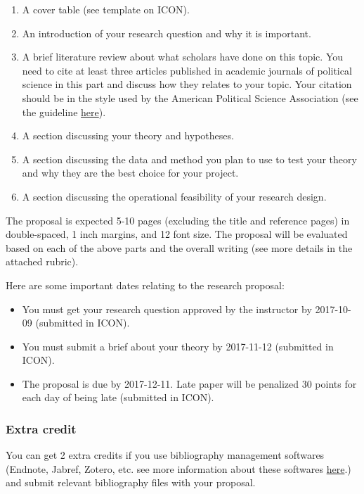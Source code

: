\documentclass[11pt,]{article}
\providecommand{\tightlist}{%
  \setlength{\itemsep}{0pt}\setlength{\parskip}{0pt}}
\theoremstyle{definition}
\theoremstyle{definition}
\theoremstyle{remark}
\begin{document}
\begin{enumerate}
\def\labelenumi{\arabic{enumi}.}
\tightlist
\item
  A cover table (see template on ICON).
\item
  An introduction of your research question and why it is important.
\item
  A brief literature review about what scholars have done on this topic.
  You need to cite at least three articles published in academic
  journals of political science in this part and discuss how they
  relates to your topic. Your citation should be in the style used by
  the American Political Science Association (see the guideline
  \href{http://www.apsanet.org/portals/54/Files/Publications/APSAStyleManual2006.pdf}{here}).
\item
  A section discussing your theory and hypotheses.
\item
  A section discussing the data and method you plan to use to test your
  theory and why they are the best choice for your project.
\item
  A section discussing the operational feasibility of your research
  design.
\end{enumerate}

The proposal is expected 5-10 pages (excluding the title and reference
pages) in double-spaced, 1 inch margins, and 12 font size. The proposal
will be evaluated based on each of the above parts and the overall
writing (see more details in the attached rubric).

Here are some important dates relating to the research proposal:

\begin{itemize}
\tightlist
\item
  You must get your research question approved by the instructor by
  2017-10-09 (submitted in ICON).
\item
  You must submit a brief about your theory by 2017-11-12 (submitted in
  ICON).
\item
  The proposal is due by 2017-12-11. Late paper will be penalized 30
  points for each day of being late (submitted in ICON).
\end{itemize}

\subsubsection{Extra credit}\label{extra-credit}

You can get 2 extra credits if you use bibliography management softwares
(Endnote, Jabref, Zotero, etc. see more information about these
softwares
\href{https://en.wikipedia.org/wiki/Comparison_of_reference_management_software}{here}.)
and submit relevant bibliography files with your proposal.
\end{document}
